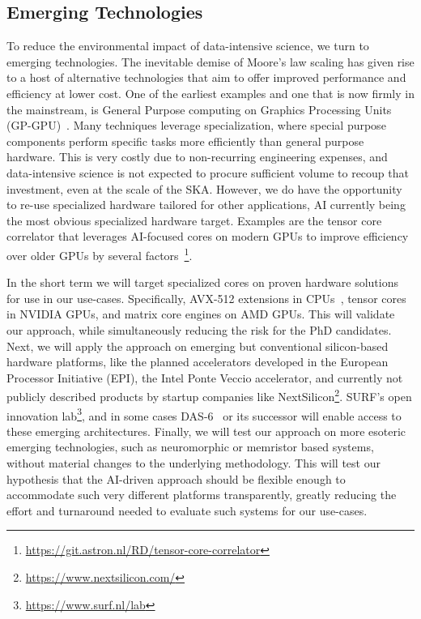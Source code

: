 \documentclass[a4wide,twocolumn]{article}
\begin{document}
\subsection{Emerging Technologies}
To reduce the environmental impact of data-intensive science, we turn to emerging technologies. The inevitable demise of Moore’s law scaling has given rise to a host of alternative technologies that aim to offer improved performance and efficiency at lower cost. One of the earliest examples and one that is now firmly in the mainstream, is General Purpose computing on Graphics Processing Units (GP-GPU)~\cite{madougou2016landscape,madougou2014empirical}. Many techniques leverage specialization, where special purpose components perform specific tasks more efficiently than general purpose hardware. This is very costly due to non-recurring engineering expenses, and data-intensive science is not expected to procure sufficient volume to recoup that investment, even at the scale of the SKA. However, we do have the opportunity to re-use specialized hardware tailored for other applications, AI currently being the most obvious specialized hardware target. Examples are the tensor core correlator that leverages AI-focused cores on modern GPUs to improve efficiency over older GPUs by several factors~\cite{romein_tensor-core_2021}\footnote{\url{https://git.astron.nl/RD/tensor-core-correlator}}. 

In the short term we will target specialized cores on proven hardware solutions for use in our use-cases. Specifically, AVX-512 extensions in CPUs~\cite{carneiro_lightweight_2021}, tensor cores in NVIDIA GPUs, and matrix core engines on AMD GPUs. This will validate our approach, while simultaneously reducing the risk for the PhD candidates. Next, we will apply the approach on emerging but conventional silicon-based hardware platforms, like the planned accelerators developed in the European Processor Initiative (EPI), the Intel Ponte Veccio accelerator, and currently not publicly described products by startup companies like NextSilicon\footnote{\url{https://www.nextsilicon.com/}}. SURF’s open innovation lab\footnote{\url{https://www.surf.nl/lab}}, and in some cases DAS-6~\cite{bal_distributed_2000} or its successor will enable access to these emerging architectures. Finally, we will test our approach on more esoteric emerging technologies, such as neuromorphic or memristor based systems, without material changes to the underlying methodology. This will test our hypothesis that the AI-driven approach should be flexible enough to accommodate such very different platforms transparently, greatly reducing the effort and turnaround needed to evaluate such systems for our use-cases.
\end{document}
